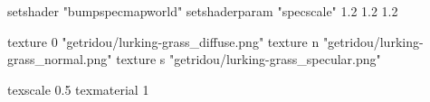 setshader "bumpspecmapworld"
setshaderparam "specscale" 1.2 1.2 1.2

   texture 0 "getridou/lurking-grass_diffuse.png"
   texture n "getridou/lurking-grass_normal.png"
   texture s "getridou/lurking-grass_specular.png"

texscale 0.5
texmaterial 1
